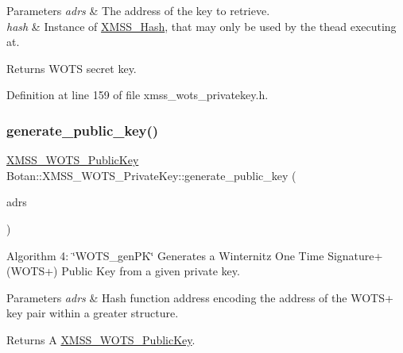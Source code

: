 \begin{DoxyParams}{Parameters}
{\em adrs} & The address of the key to retrieve. \\
\hline
{\em hash} & Instance of \mbox{\hyperlink{class_botan_1_1_x_m_s_s___hash}{X\+M\+S\+S\+\_\+\+Hash}}, that may only be used by the thead executing at.\\
\hline
\end{DoxyParams}
\begin{DoxyReturn}{Returns}
W\+O\+TS secret key. 
\end{DoxyReturn}


Definition at line 159 of file xmss\+\_\+wots\+\_\+privatekey.\+h.

\mbox{\label{class_botan_1_1_x_m_s_s___w_o_t_s___private_key_a6557ddafc4e18ce4750c8a69b843481d}} 
\subsubsection{\texorpdfstring{generate\+\_\+public\+\_\+key()}{generate\_public\_key()}\hspace{0.1cm}{\footnotesize\ttfamily [1/3]}}
{\footnotesize\ttfamily \mbox{\hyperlink{class_botan_1_1_x_m_s_s___w_o_t_s___public_key}{X\+M\+S\+S\+\_\+\+W\+O\+T\+S\+\_\+\+Public\+Key}} Botan\+::\+X\+M\+S\+S\+\_\+\+W\+O\+T\+S\+\_\+\+Private\+Key\+::generate\+\_\+public\+\_\+key (\begin{DoxyParamCaption}\item[{\mbox{\hyperlink{class_botan_1_1_x_m_s_s___address}{X\+M\+S\+S\+\_\+\+Address}} \&}]{adrs }\end{DoxyParamCaption})}

Algorithm 4\+: \char`\"{}\+W\+O\+T\+S\+\_\+gen\+P\+K\char`\"{} Generates a Winternitz One Time Signature+ (W\+O\+T\+S+) Public Key from a given private key.


\begin{DoxyParams}{Parameters}
{\em adrs} & Hash function address encoding the address of the W\+O\+T\+S+ key pair within a greater structure.\\
\hline
\end{DoxyParams}
\begin{DoxyReturn}{Returns}
A \mbox{\hyperlink{class_botan_1_1_x_m_s_s___w_o_t_s___public_key}{X\+M\+S\+S\+\_\+\+W\+O\+T\+S\+\_\+\+Public\+Key}}. 
\end{DoxyReturn}


